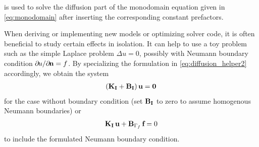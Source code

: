  is used to solve the diffusion part of the monodomain equation given in \cref{eq:monodomain} after inserting the corresponding constant prefactors.

When deriving or implementing new models or optimizing solver code, it is often beneficial to study certain effects in isolation. It can help to use a toy problem such as the simple Laplace problem $Δu = 0$, possibly with Neumann boundary condition $\partial u/\partial \bfn = f$. 
By specializing the formulation in \cref{eq:diffusion_helper2} accordingly, we obtain the system
%
\begin{align*}
  (\textbf{K}_{\textbf{I}} + \textbf{B}_{\textbf{I}})\,\textbf{u} = \textbf{0}
\end{align*}
for the case without boundary condition (set $\textbf{B}_{\textbf{I}}$ to zero to assume homogenous Neumann boundaries) or
\begin{align}\label{eq:discretization_laplace}
  \textbf{K}_{\textbf{I}}\,\textbf{u} + \textbf{B}_{\Gamma_f}\,\textbf{f} = 0
\end{align}
to include the formulated Neumann boundary condition.

